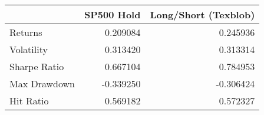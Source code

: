 \begin{tabular}{lrr}
\toprule
{} &  SP500 Hold &  Long/Short (Texblob) \\
\midrule
Returns      &    0.209084 &              0.245936 \\
Volatility   &    0.313420 &              0.313314 \\
Sharpe Ratio &    0.667104 &              0.784953 \\
Max Drawdown &   -0.339250 &             -0.306424 \\
Hit Ratio    &    0.569182 &              0.572327 \\
\bottomrule
\end{tabular}
